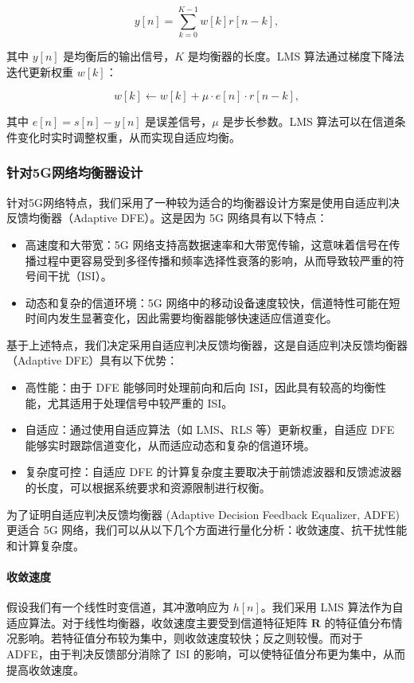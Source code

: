 \documentclass[UTF8,a4paper,12pt]{ctexart}
\numberwithin{equation}{section}
\begin{document}
\begin{equation}
	y[n] = \sum_{k=0}^{K-1} w[k] r[n-k],
\end{equation}

其中 $y[n]$ 是均衡后的输出信号，$K$ 是均衡器的长度。LMS 算法通过梯度下降法迭代更新权重 $w[k]$：

\begin{equation}
	w[k] \leftarrow w[k] + \mu \cdot e[n] \cdot r[n-k],
\end{equation}

其中 $e[n] = s[n] - y[n]$ 是误差信号，$\mu$ 是步长参数。LMS 算法可以在信道条件变化时实时调整权重，从而实现自适应均衡。

\subsubsection{针对5G网络均衡器设计}针对5G网络特点，我们采用了一种较为适合的均衡器设计方案是使用自适应判决反馈均衡器（Adaptive DFE）。这是因为 5G 网络具有以下特点：
\begin{itemize}
	\item 高速度和大带宽：5G 网络支持高数据速率和大带宽传输，这意味着信号在传播过程中更容易受到多径传播和频率选择性衰落的影响，从而导致较严重的符号间干扰（ISI）。
	\item 动态和复杂的信道环境：5G 网络中的移动设备速度较快，信道特性可能在短时间内发生显著变化，因此需要均衡器能够快速适应信道变化。
\end{itemize}
基于上述特点，我们决定采用自适应判决反馈均衡器，这是自适应判决反馈均衡器（Adaptive DFE）具有以下优势：
\begin{itemize}
	\item 高性能：由于 DFE 能够同时处理前向和后向 ISI，因此具有较高的均衡性能，尤其适用于处理信号中较严重的 ISI。
	\item 自适应：通过使用自适应算法（如 LMS、RLS 等）更新权重，自适应 DFE 能够实时跟踪信道变化，从而适应动态和复杂的信道环境。
	\item 复杂度可控：自适应 DFE 的计算复杂度主要取决于前馈滤波器和反馈滤波器的长度，可以根据系统要求和资源限制进行权衡。
\end{itemize}
为了证明自适应判决反馈均衡器 (Adaptive Decision Feedback Equalizer, ADFE) 更适合 5G 网络，我们可以从以下几个方面进行量化分析：收敛速度、抗干扰性能和计算复杂度。

\paragraph{收敛速度}
假设我们有一个线性时变信道，其冲激响应为 $h[n]$。我们采用 LMS 算法作为自适应算法。对于线性均衡器，收敛速度主要受到信道特征矩阵 $\mathbf{R}$ 的特征值分布情况影响。若特征值分布较为集中，则收敛速度较快；反之则较慢。而对于 ADFE，由于判决反馈部分消除了 ISI 的影响，可以使特征值分布更为集中，从而提高收敛速度。
\end{document}
